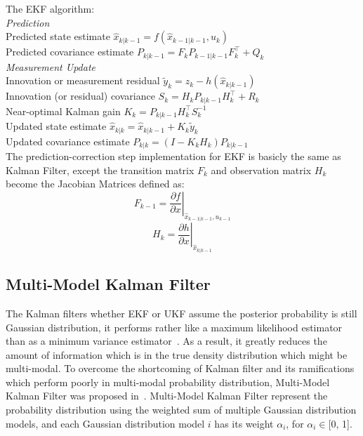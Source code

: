 \noindent The \gls{EKF} algorithm:  \\
\noindent\textit{Prediction}\\
Predicted state estimate
$\hat{x}_{k|k-1} = f(\hat{x}_{k-1|k-1}, u_{k})$ \\
Predicted covariance estimate
$P_{k|k-1} =  {{F_{k}}} P_{k-1|k-1}{ {F_{k}^\top}} + Q_{k}$ \\

\noindent\textit{Measurement Update}\\
Innovation or measurement residual
$\tilde{y}_{k} = z_{k} - h(\hat{x}_{k|k-1})$ \\
Innovation (or residual) covariance
$S_{k} = {{H_{k}}}P_{k|k-1}{{H_{k}^\top}} + R_{k}$ \\
Near-optimal Kalman gain
$K_{k} = P_{k|k-1}{{H_{k}^\top}}S_{k}^{-1}$ \\
Updated state estimate
$\hat{x}_{k|k} = \hat{x}_{k|k-1} + K_{k}\tilde{y}_{k}$ \\
Updated covariance estimate
$P_{k|k} = (I - K_{k} {{H_{k}}}) P_{k|k-1}$ \\

The prediction-correction step implementation for \gls{EKF} is basicly the same as Kalman Filter, except the transition matrix $F_{k}$ and observation matrix $H_{k}$ become the Jacobian Matrices defined as: \\
$${{F_{k-1}}} = \left . \frac{\partial f}{\partial x } \right \vert _{\hat{x}_{k-1|k-1},u_{k-1}}$$
$${{H_{k}}} = \left . \frac{\partial h}{\partial x } \right \vert _{\hat{x}_{k|k-1}}$$


\subsection{Multi-Model Kalman Filter}
The Kalman filters whether \gls{EKF} or \gls{UKF} assume the posterior probability is still Gaussian distribution, it performs rather like a maximum likelihood estimator than as a minimum variance estimator~\cite{alspach1972nonlinear}. As a result, it greatly reduces the amount of information which is in the true density distribution which might be multi-modal. To overcome the shortcoming of Kalman filter and its ramifications which perform poorly in multi-modal probability distribution, Multi-Model Kalman Filter was proposed in~\cite{alspach1972nonlinear}. Multi-Model Kalman Filter represent the probability distribution using the weighted sum of multiple Gaussian distribution models, and each Gaussian distribution model $i$ has its weight $\alpha_i$, for $\alpha_i \in $[0, 1].

